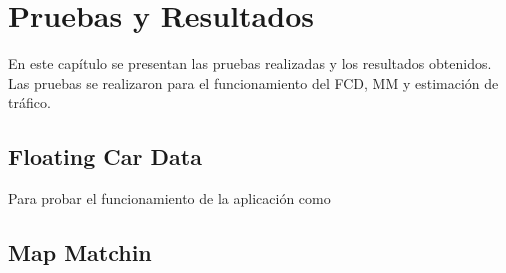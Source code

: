 \chapter{Pruebas y Resultados}

En este capítulo se presentan las pruebas realizadas y los resultados obtenidos. Las pruebas se realizaron para el funcionamiento del FCD, MM y estimación de tráfico.

\section{Floating Car Data}

Para probar el funcionamiento de la aplicación como 

\section{Map Matchin}


